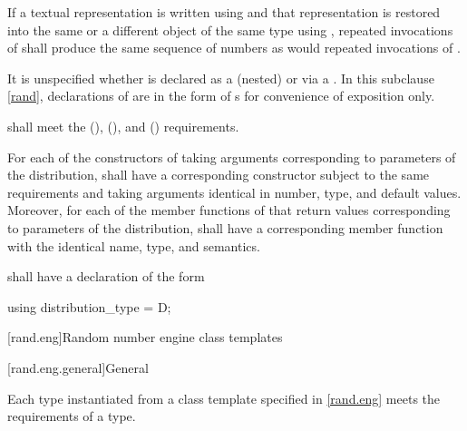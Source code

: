 \pnum
If a textual representation is written using 
and that representation is restored
into the same or a different object 
of the same type using ,
repeated invocations of 
shall produce the same sequence of numbers
as would repeated invocations of .

\pnum
It is unspecified whether 
is declared as a (nested) 
or via a .
In this subclause \ref{rand},
declarations of 
are in the form of s
for convenience of exposition only.

\pnum
{} shall meet the
 (),
 (),
and
 () requirements.

\pnum
For each of the constructors of 
taking arguments corresponding to parameters of the distribution,
 shall have a corresponding constructor
subject to the same requirements
and taking arguments identical in number, type, and default values.
Moreover,
for each of the member functions of 
that return values corresponding to parameters of the distribution,
 shall have a corresponding member function
with the identical name, type, and semantics.

\pnum
{} shall have a declaration of the form
\begin{codeblock}
using distribution_type =  D;
\end{codeblock}

%
%




[rand.eng]{Random number engine class templates}%

[rand.eng.general]{General}%

\pnum
Each type instantiated
from a class template specified in \ref{rand.eng}
meets the requirements
of a  type.

